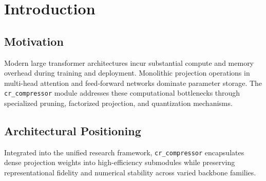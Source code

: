 \section{Introduction}

\subsection{Motivation}
Modern large transformer architectures incur substantial compute and memory overhead during training and deployment. Monolithic projection operations in multi-head attention and feed-forward networks dominate parameter storage. The \texttt{cr_compressor} module addresses these computational bottlenecks through specialized pruning, factorized projection, and quantization mechanisms.

\subsection{Architectural Positioning}
Integrated into the unified research framework, \texttt{cr_compressor} encapsulates dense projection weights into high-efficiency submodules while preserving representational fidelity and numerical stability across varied backbone families.
